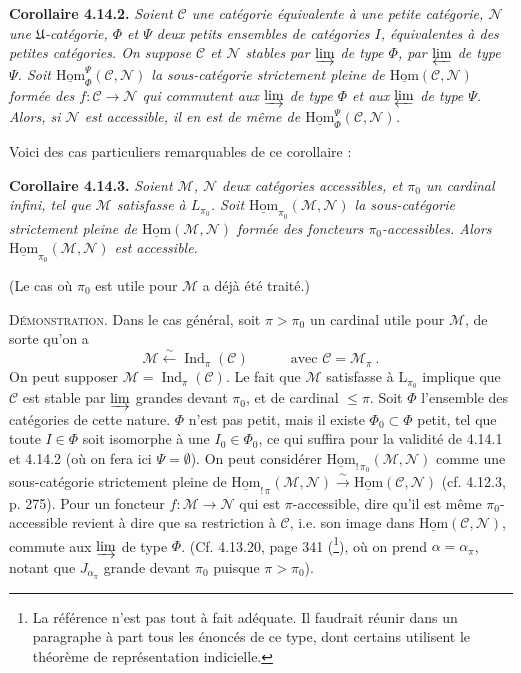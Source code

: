 \documentclass[11pt]{article}
\newcommand{\msp}[1]{\marginpar{\footnotesize [#1]}}
\newcommand{\uHom}{\underline{\mathrm{Hom}}}
\newcommand{\Ind}{\operatorname{Ind}}
\begin{document}
\msp{page 372}

\noindent\textbf{Corollaire 4.14.2.} {\itshape Soient $\mathcal{C}$ une catégorie équivalente à une petite catégorie, $\mathcal{N}$ une $\mathfrak{U}$-catégorie, $\Phi$ et $\Psi$ deux petits ensembles de catégories $I$, équivalentes à des petites catégories. On suppose $\mathcal{C}$ et $\mathcal{N}$ stables par $\varinjlim$ de type $\Phi$, par $\varprojlim$ de type $\Psi$. Soit $\uHom^{\Psi}_{\Phi}(\mathcal{C},\mathcal{N})$ la sous-catégorie strictement pleine de $\uHom(\mathcal{C},\mathcal{N})$ formée des $f:\mathcal{C}\longrightarrow\mathcal{N}$ qui commutent aux $\varinjlim$ de type $\Phi$ et aux $\varprojlim$ de type $\Psi$. Alors, si $\mathcal{N}$ est accessible, il en est de même de $\uHom^{\Psi}_{\Phi}(\mathcal{C},\mathcal{N})$.}

Voici des cas particuliers remarquables de ce corollaire :

\noindent\textbf{Corollaire 4.14.3.} {\itshape Soient $\mathcal{M}$, $\mathcal{N}$ deux catégories accessibles, et $\pi_0$ un cardinal infini, tel que $\mathcal{M}$ satisfasse à $L_{\pi_0}$. Soit $\uHom_{\pi_0}(\mathcal{M},\mathcal{N})$ la sous-catégorie strictement pleine de $\uHom(\mathcal{M},\mathcal{N})$ formée des foncteurs $\pi_0$-accessibles. Alors $\uHom_{\pi_0}(\mathcal{M},\mathcal{N})$ est accessible.}

\msp{page 373}

(Le cas où $\pi_0$ est utile pour $\mathcal{M}$ a déjà été traité.)

\noindent\textsc{Démonstration}. Dans le cas général, soit $\pi>\pi_0$ un cardinal utile pour $\mathcal{M}$, de sorte qu'on a
\[
\mathcal{M} \xleftarrow{\ \sim\ } \Ind_\pi(\mathcal{C}) \qquad\quad \text{avec } \mathcal{C}=\mathcal{M}_\pi\ .
\]
On peut supposer $\mathcal{M}=\Ind_\pi(\mathcal{C})$. Le fait que $\mathcal{M}$ satisfasse à $\mathrm{L}_{\pi_0}$ implique que $\mathcal{C}$ est stable par $\varinjlim$ grandes devant $\pi_0$, et de cardinal $\leqslant\pi$. Soit $\Phi$ l'ensemble des catégories de cette nature. $\Phi$ n'est pas petit, mais il existe $\Phi_0\subset\Phi$ petit, tel que toute $I\in\Phi$ soit isomorphe à une $I_0\in\Phi_0$, ce qui suffira pour la validité de 4.14.1 et 4.14.2 (où on fera ici $\Psi=\emptyset$). On peut considérer $\uHom_{!\,\pi_0}(\mathcal{M},\mathcal{N})$ comme une sous-catégorie strictement pleine de $\uHom_{!\,\pi}(\mathcal{M},\mathcal{N})\xrightarrow{\ \sim\ }\uHom(\mathcal{C},\mathcal{N})$ (cf. 4.12.3, p. 275). Pour un foncteur $f:\mathcal{M}\longrightarrow\mathcal{N}$ qui est $\pi$-accessible, dire qu'il est même $\pi_0$-accessible revient à dire que sa restriction à $\mathcal{C}$, i.e. son image dans $\uHom(\mathcal{C},\mathcal{N})$, commute aux $\varinjlim$ de type $\Phi$. (Cf. 4.13.20, page 341 (\footnote[164]{La référence n'est pas tout à fait adéquate. Il faudrait réunir dans un paragraphe à part tous les énoncés de ce type, dont certains utilisent le théorème de représentation indicielle.}), où on prend $\alpha=\alpha_\pi$, notant que $J_{\alpha_\pi}$ grande devant $\pi_0$ puisque $\pi>\pi_0$).
\end{document}
